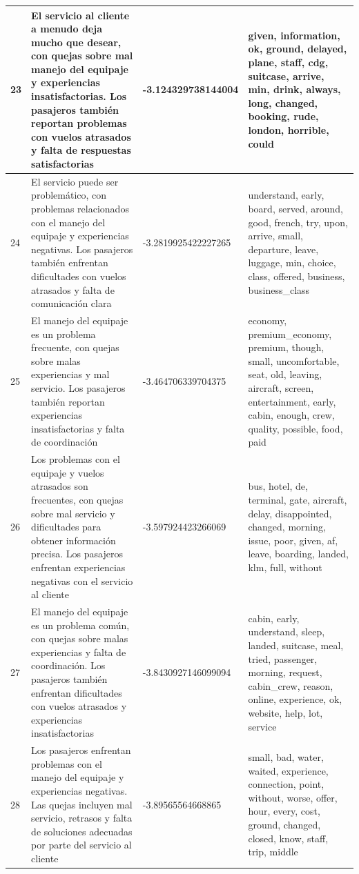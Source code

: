 \documentclass{report}
\begin{document}
{\begin{longtable}{|p{1cm}|p{4cm}|p{4cm}|p{6cm}|}
                    \hline
                    23 & El servicio al cliente a menudo deja mucho que desear, con quejas sobre mal manejo del equipaje y experiencias insatisfactorias. Los pasajeros también reportan problemas con vuelos atrasados y falta de respuestas satisfactorias & -3.124329738144004 & given, information, ok, ground, delayed, plane, staff, cdg, suitcase, arrive, min, drink, always, long, changed, booking, rude, london, horrible, could \\
                    \hline
                    24 & El servicio puede ser problemático, con problemas relacionados con el manejo del equipaje y experiencias negativas. Los pasajeros también enfrentan dificultades con vuelos atrasados y falta de comunicación clara & -3.2819925422227265 & understand, early, board, served, around, good, french, try, upon, arrive, small, departure, leave, luggage, min, choice, class, offered, business, business\_class \\
                    \hline
                    25 & El manejo del equipaje es un problema frecuente, con quejas sobre malas experiencias y mal servicio. Los pasajeros también reportan experiencias insatisfactorias y falta de coordinación & -3.464706339704375 & economy, premium\_economy, premium, though, small, uncomfortable, seat, old, leaving, aircraft, screen, entertainment, early, cabin, enough, crew, quality, possible, food, paid \\
                    \hline
                    26 & Los problemas con el equipaje y vuelos atrasados son frecuentes, con quejas sobre mal servicio y dificultades para obtener información precisa. Los pasajeros enfrentan experiencias negativas con el servicio al cliente & -3.597924423266069 & bus, hotel, de, terminal, gate, aircraft, delay, disappointed, changed, morning, issue, poor, given, af, leave, boarding, landed, klm, full, without \\
                    \hline
                    27 & El manejo del equipaje es un problema común, con quejas sobre malas experiencias y falta de coordinación. Los pasajeros también enfrentan dificultades con vuelos atrasados y experiencias insatisfactorias & -3.8430927146099094 & cabin, early, understand, sleep, landed, suitcase, meal, tried, passenger, morning, request, cabin\_crew, reason, online, experience, ok, website, help, lot, service \\
                    \hline
                    28 & Los pasajeros enfrentan problemas con el manejo del equipaje y experiencias negativas. Las quejas incluyen mal servicio, retrasos y falta de soluciones adecuadas por parte del servicio al cliente & -3.89565564668865 & small, bad, water, waited, experience, connection, point, without, worse, offer, hour, every, cost, ground, changed, closed, know, staff, trip, middle \\

\end{longtable}}
\end{document}
